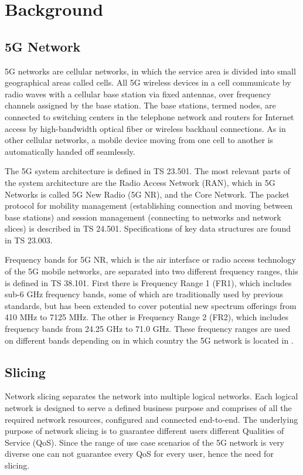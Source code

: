 
\chapter{Background}
\label{chapter:background}
\section{5G Network}
5G networks are cellular networks, in which the service area is divided into small geographical areas called cells. All 5G wireless devices in a cell communicate by radio waves with a cellular base station via fixed antennas, over frequency channels assigned by the base station. The base stations, termed nodes, are connected to switching centers in the telephone network and routers for Internet access by high-bandwidth optical fiber or wireless backhaul connections. As in other cellular networks, a mobile device moving from one cell to another is automatically handed off seamlessly.


The 5G system architecture is defined in TS 23.501. The most relevant parts of the system architecture are the Radio Access Network (RAN), which in 5G Networks is called 5G New Radio (5G NR), and the Core Network. The packet protocol for mobility management (establishing connection and moving between base stations) and session management (connecting to networks and network slices) is described in TS 24.501. Specifications of key data structures are found in TS 23.003.


Frequency bands for 5G NR, which is the air interface or radio access technology of the 5G mobile networks, are separated into two different frequency ranges, this is defined in TS 38.101. First there is Frequency Range 1 (FR1), which includes sub-6 GHz frequency bands, some of which are traditionally used by previous standards, but has been extended to cover potential new spectrum offerings from 410 MHz to 7125 MHz. The other is Frequency Range 2 (FR2), which includes frequency bands from 24.25 GHz to 71.0 GHz. These frequency ranges are used on different bands depending on in which country the 5G network is located in \cite{zhang2017overview}. 

\section{Slicing}
Network slicing separates the network into multiple logical networks. Each logical network is designed to serve a defined business purpose and comprises of all the required network resources, configured and connected end-to-end. 
The underlying purpose of network slicing is to guarantee different users different Qualities of Service (QoS).
Since the range of use case scenarios of the 5G network is very diverse one can not guarantee every QoS for every user, hence the need for slicing.


